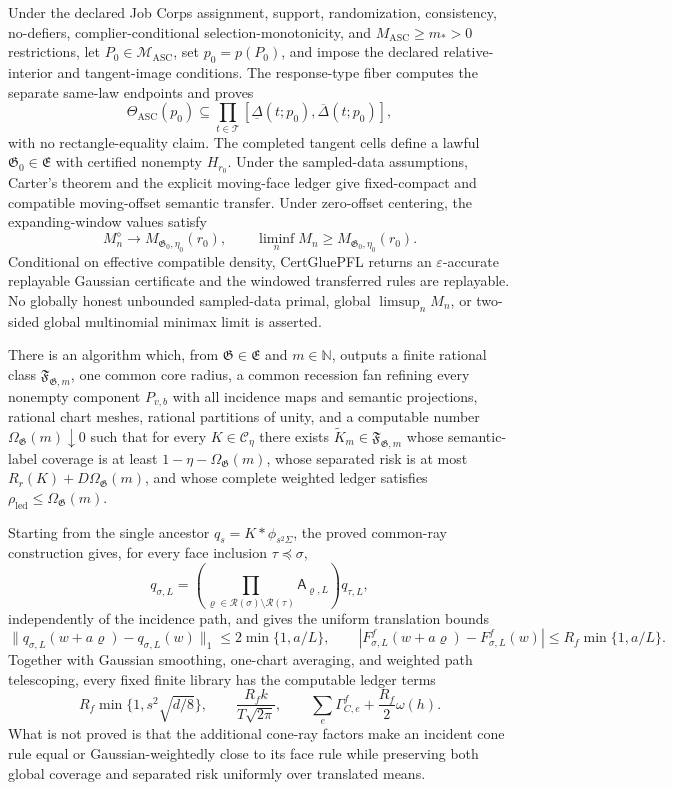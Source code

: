 Under the declared Job Corps assignment, support, randomization, consistency, no-defiers, complier-conditional selection-monotonicity, and \(M_{\mathrm{ASC}}\ge m_*>0\) restrictions, let \(P_0\in\mathcal M_{\mathrm{ASC}}\), set \(p_0=p(P_0)\), and impose the declared relative-interior and tangent-image conditions. The response-type fiber computes the separate same-law endpoints and proves
\[
 \Theta_{\mathrm{ASC}}(p_0)
 \subseteq\prod_{t\in\mathcal T}
 [\underline\Delta(t;p_0),\overline\Delta(t;p_0)],
\]
with no rectangle-equality claim. The completed tangent cells define a lawful \(\mathfrak G_0\in\mathfrak E\) with certified nonempty \(H_{r_0}\). Under the sampled-data assumptions, Carter's theorem and the explicit moving-face ledger give fixed-compact and compatible moving-offset semantic transfer. Under zero-offset centering, the expanding-window values satisfy
\[
 M_n^{\diamond}\to M_{\mathfrak G_0,\eta_0}(r_0),
 \qquad
 \liminf_nM_n\ge M_{\mathfrak G_0,\eta_0}(r_0).
\]
Conditional on effective compatible density, CertGluePFL returns an \(\varepsilon\)-accurate replayable Gaussian certificate and the windowed transferred rules are replayable. No globally honest unbounded sampled-data primal, global \(\limsup_nM_n\), or two-sided global multinomial minimax limit is asserted.

There is an algorithm which, from \(\mathfrak G\in\mathfrak E\) and \(m\in\mathbb N\), outputs a finite rational class \(\mathfrak F_{\mathfrak G,m}\), one common core radius, a common recession fan refining every nonempty component \(P_{v,b}\) with all incidence maps and semantic projections, rational chart meshes, rational partitions of unity, and a computable number \(\Omega_{\mathfrak G}(m)\downarrow0\) such that for every \(K\in\mathcal C_{\eta}\) there exists \(\widetilde K_m\in\mathfrak F_{\mathfrak G,m}\) whose semantic-label coverage is at least \(1-\eta-\Omega_{\mathfrak G}(m)\), whose separated risk is at most \(R_r(K)+D\Omega_{\mathfrak G}(m)\), and whose complete weighted ledger satisfies \(\rho_{\mathrm{led}}\le\Omega_{\mathfrak G}(m)\).

Starting from the single ancestor \(q_s=K*\phi_{s^2\Sigma}\), the proved common-ray construction gives, for every face inclusion \(\tau\preceq\sigma\),
\[
 q_{\sigma,L}=
 \left(\prod_{\varrho\in\mathscr R(\sigma)\setminus\mathscr R(\tau)}
 \mathsf A_{\varrho,L}\right)q_{\tau,L},
\]
independently of the incidence path, and gives the uniform translation bounds
\[
 \|q_{\sigma,L}(w+a\varrho)-q_{\sigma,L}(w)\|_1
 \le2\min\{1,a/L\},
 \qquad
 |F^f_{\sigma,L}(w+a\varrho)-F^f_{\sigma,L}(w)|
 \le R_f\min\{1,a/L\}.
\]
Together with Gaussian smoothing, one-chart averaging, and weighted path telescoping, every fixed finite library has the computable ledger terms
\[
 R_f\min\{1,s^2\sqrt{d/8}\},\qquad
 \frac{R_fk}{T\sqrt{2\pi}},\qquad
 \sum_e\Gamma_{C,e}^f+\frac{R_f}{2}\omega(h).
\]
What is not proved is that the additional cone-ray factors make an incident cone rule equal or Gaussian-weightedly close to its face rule while preserving both global coverage and separated risk uniformly over translated means.
